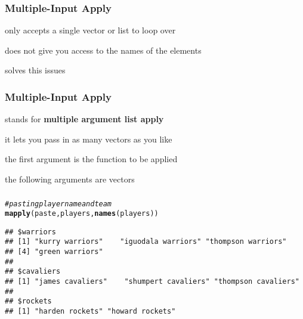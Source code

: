 \documentclass[12pt]{beamer}\usepackage[]{graphicx}\usepackage[]{color}
\makeatletter
\newcommand{\hlcom}[1]{\textcolor[rgb]{0.678,0.584,0.686}{\textit{#1}}}%
\newcommand{\hlstd}[1]{\textcolor[rgb]{0.345,0.345,0.345}{#1}}%
\newcommand{\hlkwd}[1]{\textcolor[rgb]{0.737,0.353,0.396}{\textbf{#1}}}%
\newenvironment{kframe}{%
 \def\at@end@of@kframe{}%
 \ifinner\ifhmode%
  \def\at@end@of@kframe{\end{minipage}}%
  \begin{minipage}{\columnwidth}%
 \fi\fi%
 \def\FrameCommand##1{\hskip\@totalleftmargin \hskip-\fboxsep
 \colorbox{shadecolor}{##1}\hskip-\fboxsep
     \hskip-\linewidth \hskip-\@totalleftmargin \hskip\columnwidth}%
 \MakeFramed {\advance\hsize-\width
   \@totalleftmargin\z@ \linewidth\hsize
   \@setminipage}}%
 {\par\unskip\endMakeFramed%
 \at@end@of@kframe}
\newenvironment{knitrout}{}{} %
\makeatother
\begin{document}

\begin{frame}
\begin{center}
\Huge{}
\end{center}
\end{frame}


\begin{frame}
\frametitle{Multiple-Input Apply}

\bbi
  \item {} only accepts a single vector or list to loop over
  \item {} does not give you access to the names of the elements
  \item {} solves this issues
\ei

\end{frame}


\begin{frame}
\frametitle{Multiple-Input Apply}

\bi
  \item {\hilit {}} stands for \textbf{multiple argument list apply}
  \item it lets you pass in as many vectors as you like
  \item the first argument is the function to be applied
  \item the following arguments are vectors
\ei

\end{frame}


\begin{frame}[fragile]
\frametitle{}

\begin{knitrout}\scriptsize
{}\color{fgcolor}\begin{kframe}
\begin{alltt}
\hlcom{# pasting player name and team}
\hlkwd{mapply}\hlstd{(paste, players,} \hlkwd{names}\hlstd{(players))}
\end{alltt}
\begin{verbatim}
## $warriors
## [1] "kurry warriors"    "iguodala warriors" "thompson warriors"
## [4] "green warriors"   
## 
## $cavaliers
## [1] "james cavaliers"    "shumpert cavaliers" "thompson cavaliers"
## 
## $rockets
## [1] "harden rockets" "howard rockets"
\end{verbatim}
\end{kframe}
\end{knitrout}

\end{frame}
\end{document}
